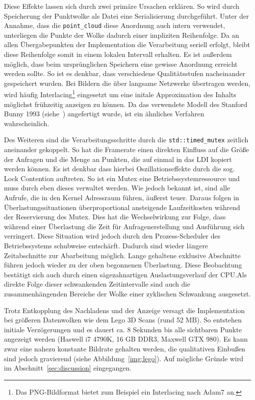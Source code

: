 \documentclass[hyperref, beleg, german]{cgvpub}
\begin{document}
Diese Effekte lassen sich durch zwei primäre Ursachen erklären. So wird durch
Speicherung der Punktwolke als Datei eine Serialisierung durchgeführt. Unter
der Annahme, dass die \texttt{point\_cloud} diese Anordnung auch intern
verwendet, unterliegen die Punkte der Wolke dadurch einer impliziten
Reihenfolge. Da an allen Übergabepunkten der Implementation die Verarbeitung
seriell erfolgt, bleibt diese Reihenfolge somit in einem lokalen Intervall
erhalten. Es ist außerdem möglich, dass beim ursprünglichen Speichern eine
gewisse Anordnung erreicht werden sollte. So ist es denkbar, dass verschiedene
Qualitätsstufen nacheinander gespeichert wurden. Bei Bildern die über langsame
Netzwerke übertragen werden, wird häufig Interlacing\footnote{Das
PNG-Bildformat bietet zum Beispiel ein Interlacing nach Adam7 an.} eingesetzt
um eine initale Approximation des Inhalts möglichst frühzeitig anzeigen zu
können. Da das verwendete Modell des Stanford Bunny 1993 (siehe~\cite{bunny})
angefertigt wurde, ist ein ähnliches Verfahren wahrscheinlich.

Des Weiteren sind die Verarbeitungsschritte durch die
\texttt{std::timed\_mutex} zeitlich aneinander gekoppelt. So hat die Framerate
einen direkten Einfluss auf die Größe der Anfragen und die Menge an Punkten,
die auf einmal in das LDI kopiert werden können. Es ist denkbar dass hierbei
Oszillationseffekte durch die sog. Lock Contention auftreten. So ist ein Mutex
eine Betriebssystemressource und muss durch eben dieses verwaltet werden. Wie
jedoch bekannt ist, sind alle Aufrufe, die in den Kernel Adressraum führen,
äußerst teuer. Daraus folgen in Überlastungssituationen überproportional
ansteigende Laufzeitkosten während der Reservierung des Mutex. Dies hat die
Wechselwirkung zur Folge, dass während einer Überlastung die Zeit für
Anfragenerstellung und Ausführung sich verringert. Diese Situation wird jedoch
durch den Prozess-Scheduler des Betriebssystems schubweise entschärft. Dadurch
sind wieder längere Zeitabschnitte zur Abarbeitung möglich. Lange gehaltene
exklusive Abschnitte führen jedoch wieder zu der oben begonnenen Überlastung.
Diese Beobachtung bestätigt sich auch durch einen sägezahnartigen
Auslastungsverlauf der CPU.\@ Als direkte Folge dieser schwankenden
Zeitintervalle sind auch die zusammenhängenden Bereiche der Wolke einer
zyklischen Schwankung ausgesetzt.

Trotz Entkopplung des Nachladens und der Anzeige versagt die Implementation bei
größeren Datenwolken wie dem Lego 3D Scans (rund 52 MB). So entstehen initiale
Verzögerungen und es dauert ca. 8 Sekunden bis alle sichtbaren Punkte angezeigt
werden (Haswell i7 4790K, 16 GB DDR3, Maxwell GTX 980). Es kann zwar eine
nahezu konstante Bildrate gehalten werden, die qualitativen Einbußen sind
jedoch gravierend (siehe Abbildung~\ref{img:lego}). Auf mögliche Gründe wird im
Abschnitt~\ref{sec:discussion} eingegangen.
\end{document}
